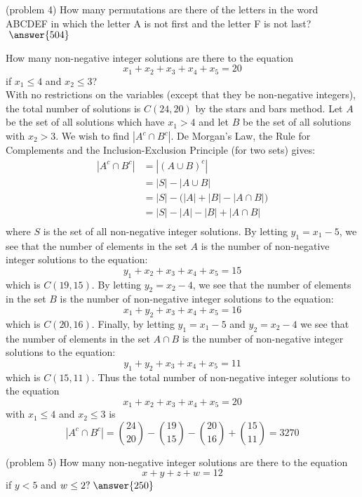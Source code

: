 \documentclass[handout]{ximera}
\begin{document}
\begin{problem}(problem 4)
How many permutations are there of the letters in the word ABCDEF in which the letter A is not 
first and the letter F is not last? $\; \answer{504}$
\end{problem}



\begin{example}[example 5]
How many non-negative integer solutions are there to the equation
\[
x_1 + x_2 + x_3 + x_4 + x_5 = 20
\]
if $x_1 \leq 4$ and $x_2 \leq 3$?\\
With no restrictions on the variables (except that they be non-negative integers), 
the total number of solutions is $C(24, 20)$ by the stars and bars method.
Let $A$ be the set of all solutions which have $x_1 > 4$ and let $B$ be the set of all solutions with $x_2 > 3$.
We wish to find $|A^c \cap B^c|$.
De Morgan's Law, the Rule for Complements and the Inclusion-Exclusion Principle (for two sets) gives:
\begin{align*}
|A^c \cap B^c| &= |(A \cup B)^c|\\
               &= |S| - |A\cup B|\\
               &= |S| - \Big(|A| + |B| - |A\cap B|\Big)\\
               &= |S| - |A| - |B| + |A\cap B|\\
\end{align*}
where $S$ is the set of all non-negative integer solutions. By letting $y_1 = x_1 -5$, we see that 
the number of elements in the set $A$
is the number of non-negative integer solutions to the equation:
\[
y_1 + x_2 + x_3 + x_4 + x_5 = 15
\]
which is $C(19, 15)$. By letting $y_2 = x_2 -4$, we see that the number of elements in the set $B$
is the number of non-negative integer solutions to the equation:
\[
x_1 + y_2 + x_3 + x_4 + x_5 = 16
\]
which is $C(20, 16)$. Finally, by letting $y_1 = x_1 -5$ and $y_2 = x_2 -4$ we see that the number of 
elements in the set $A \cap B$
is the number of non-negative integer solutions to the equation:
\[
y_1 + y_2 + x_3 + x_4 + x_5 = 11
\]
which is $C(15, 11)$. 
Thus the total number of non-negative integer solutions to the equation
\[
x_1 + x_2 + x_3 + x_4 + x_5 = 20
\]
with $x_1 \leq 4$ and $x_2 \leq 3$ is
\[
|A^c \cap B^c| = \binom{24}{20} - \binom{19}{15} - \binom{20}{16} + \binom{15}{11} = 3270
\]

\end{example}


\begin{problem}(problem 5)
How many non-negative integer solutions are there to the equation
\[
x + y + z + w = 12
\]
if $y < 5$ and $w \leq 2 ? \; \answer{250}$

\end{problem}
\end{document}
